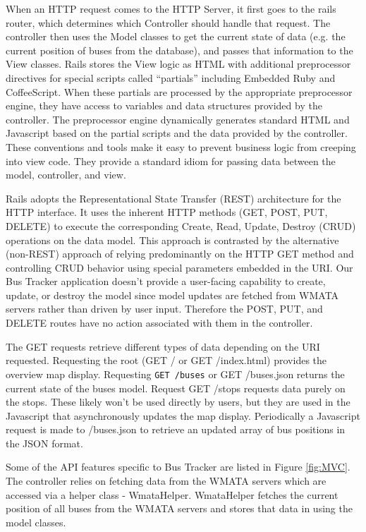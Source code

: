 \documentclass[12pt]{report}
\begin{document}
When an HTTP request comes to the HTTP Server, it first goes to the rails router, which determines which Controller should handle that request.  The controller then uses the Model classes to get the current state of data (e.g. the current position of buses from the database), and passes that information to the View classes.  Rails stores the View logic as HTML with additional preprocessor directives for special scripts called ``partials'' including Embedded Ruby and CoffeeScript.  When these partials are processed by the appropriate preprocessor engine, they have access to variables and data structures provided by the controller.  The preprocessor engine dynamically generates standard HTML and Javascript based on the partial scripts and the data provided by the controller.  These conventions and tools make it easy to prevent business logic from creeping into view code.  They provide a standard idiom for passing data between the model, controller, and view.

Rails adopts the Representational State Transfer (REST) architecture for the HTTP interface.  It uses the inherent HTTP methods (GET, POST, PUT, DELETE) to execute the corresponding Create, Read, Update, Destroy (CRUD) operations on the data model.  This approach is contrasted by the alternative (non-REST) approach of relying predominantly on the HTTP GET method and controlling CRUD behavior using special parameters embedded in the URI.  Our Bus Tracker application doesn't provide a user-facing capability to create, update, or destroy the model since model updates are fetched from WMATA servers rather than driven by user input.  Therefore the POST, PUT, and DELETE routes have no action associated with them in the controller.  

The GET requests retrieve different types of data depending on the URI requested.  Requesting the root (GET / or GET /index.html) provides the overview map display.  Requesting \lstinline|GET /buses| or GET /buses.json returns the current state of the buses model.  Request GET /stops requests data purely on the stops.  These likely won't be used directly by users, but they are used in the Javascript that asynchronously updates the map display.  Periodically a Javascript request is made to /buses.json to retrieve an updated array of bus positions in the JSON format.  

Some of the API features specific to Bus Tracker are listed in Figure \ref{fig:MVC}.  The controller relies on fetching data from the WMATA servers which  are accessed via a helper class - WmataHelper.  WmataHelper fetches the current position of all buses from the WMATA servers and stores that data in using the model classes. 
\end{document}
